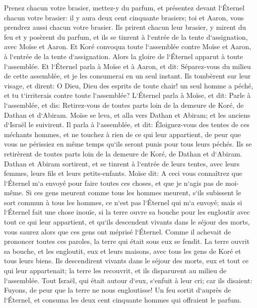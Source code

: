 \verse Prenez chacun votre brasier, mettez-y du parfum, et présentez devant l`Éternel chacun votre brasier: il y aura deux cent cinquante brasiers; toi et Aaron, vous prendrez aussi chacun votre brasier. 
\verse Ils prirent chacun leur brasier, y mirent du feu et y posèrent du parfum, et ils se tinrent à l`entrée de la tente d`assignation, avec Moïse et Aaron. 
\verse Et Koré convoqua toute l`assemblée contre Moïse et Aaron, à l`entrée de la tente d`assignation. Alors la gloire de l`Éternel apparut à toute l`assemblée. 
\verse Et l`Éternel parla à Moïse et à Aaron, et dit: 
\verse Séparez-vous du milieu de cette assemblée, et je les consumerai en un seul instant. 
\verse Ils tombèrent sur leur visage, et dirent: O Dieu, Dieu des esprits de toute chair! un seul homme a péché, et tu t`irriterais contre toute l`assemblée? 
\verse L`Éternel parla à Moïse, et dit: 
\verse Parle à l`assemblée, et dis: Retirez-vous de toutes parts loin de la demeure de Koré, de Dathan et d`Abiram. 
\verse Moïse se leva, et alla vers Dathan et Abiram; et les anciens d`Israël le suivirent. 
\verse Il parla à l`assemblée, et dit: Éloignez-vous des tentes de ces méchants hommes, et ne touchez à rien de ce qui leur appartient, de peur que vous ne périssiez en même temps qu`ils seront punis pour tous leurs péchés. 
\verse Ils se retirèrent de toutes parts loin de la demeure de Koré, de Dathan et d`Abiram. Dathan et Abiram sortirent, et se tinrent à l`entrée de leurs tentes, avec leurs femmes, leurs fils et leurs petits-enfants. 
\verse Moïse dit: A ceci vous connaîtrez que l`Éternel m`a envoyé pour faire toutes ces choses, et que je n`agis pas de moi-même. 
\verse Si ces gens meurent comme tous les hommes meurent, s`ils subissent le sort commun à tous les hommes, ce n`est pas l`Éternel qui m`a envoyé; 
\verse mais si l`Éternel fait une chose inouïe, si la terre ouvre sa bouche pour les engloutir avec tout ce qui leur appartient, et qu`ils descendent vivants dans le séjour des morts, vous saurez alors que ces gens ont méprisé l`Éternel. 
\verse Comme il achevait de prononcer toutes ces paroles, la terre qui était sous eux se fendit. 
\verse La terre ouvrit sa bouche, et les engloutit, eux et leurs maisons, avec tous les gens de Koré et tous leurs biens. 
\verse Ils descendirent vivants dans le séjour des morts, eux et tout ce qui leur appartenait; la terre les recouvrit, et ils disparurent au milieu de l`assemblée. 
\verse Tout Israël, qui était autour d`eux, s`enfuit à leur cri; car ils disaient: Fuyons, de peur que la terre ne nous engloutisse! 
\verse Un feu sortit d`auprès de l`Éternel, et consuma les deux cent cinquante hommes qui offraient le parfum. 

